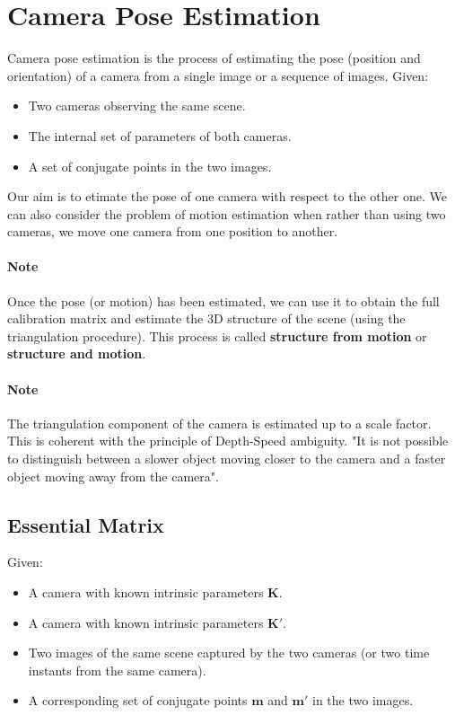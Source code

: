 \documentclass[11pt,a4paper]{article}
\theoremstyle{definition}
\theoremstyle{plain}
\theoremstyle{remark}
\begin{document}
\section{Camera Pose Estimation}

Camera pose estimation is the process of estimating the pose (position and orientation) 
of a camera from a single image or a sequence of images.
Given:
\begin{itemize}
    \item Two cameras observing the same scene.
    \item The internal set of parameters of both cameras.
    \item A set of conjugate points in the two images.
\end{itemize}
Our aim is to etimate the pose of one camera with respect to the other one.
We can also consider the problem of motion estimation when rather than using two cameras,
we move one camera from one position to another.

\paragraph{Note}
Once the pose (or motion) has been estimated, we can use it to obtain the full calibration matrix
and estimate the 3D structure of the scene (using the triangulation procedure).
This process is called \textbf{structure from motion} or \textbf{structure and motion}.

\paragraph{Note}
The triangulation component of the camera is estimated up to a scale factor.
This is coherent with the principle of Depth-Speed ambiguity.
"It is not possible to distinguish between a slower object moving closer
to the camera and a faster object moving away from the camera".

\subsection{Essential Matrix}

Given:
\begin{itemize}
    \item A camera with known intrinsic parameters $\mathbf{K}$.
    \item A camera with known intrinsic parameters $\mathbf{K}'$.
    \item Two images of the same scene captured by the two cameras (or two time instants from the same camera).
    \item A corresponding set of conjugate points $\mathbf{m}$ and $\mathbf{m}'$ in the two images.
\end{itemize}
\end{document}
